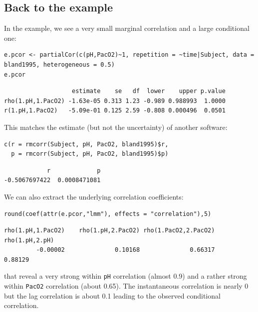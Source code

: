 \documentclass[12pt]{article}
\begin{document}
\clearpage

\subsection{Back to the example}
\label{sec:orgc8a1cbc}

In the example, we see a very small marginal correlation and a large conditional one:
\lstset{language=r,label= ,caption= ,captionpos=b,numbers=none}
\begin{lstlisting}
e.pcor <- partialCor(c(pH,PacO2)~1, repetition = ~time|Subject, data = bland1995, heterogeneous = 0.5)
e.pcor
\end{lstlisting}

\begin{verbatim}
                   estimate    se   df  lower    upper p.value
rho(1.pH,1.PacO2) -1.63e-05 0.313 1.23 -0.989 0.988993  1.0000
r(1.pH,1.PacO2)   -5.09e-01 0.125 2.59 -0.808 0.000496  0.0501
\end{verbatim}


This matches the estimate (but not the uncertainty) of another software:
\lstset{language=r,label= ,caption= ,captionpos=b,numbers=none}
\begin{lstlisting}
c(r = rmcorr(Subject, pH, PacO2, bland1995)$r,
  p = rmcorr(Subject, pH, PacO2, bland1995)$p)
\end{lstlisting}

\begin{verbatim}
            r             p 
-0.5067697422  0.0008471081
\end{verbatim}


We can also extract the underlying correlation coefficients:
\lstset{language=r,label= ,caption= ,captionpos=b,numbers=none}
\begin{lstlisting}
round(coef(attr(e.pcor,"lmm"), effects = "correlation"),5)
\end{lstlisting}

\begin{verbatim}
rho(1.pH,1.PacO2)    rho(1.pH,2.PacO2) rho(1.PacO2,2.PacO2)       rho(1.pH,2.pH) 
         -0.00002              0.10168              0.66317              0.88129
\end{verbatim}


that reveal a very strong within \texttt{pH} correlation (almost 0.9) and a
rather strong within \texttt{PacO2} correlation (about 0.65). The
instantaneous correlation is nearly 0 but the lag correlation is about
0.1 leading to the observed conditional correlation.
\end{document}
